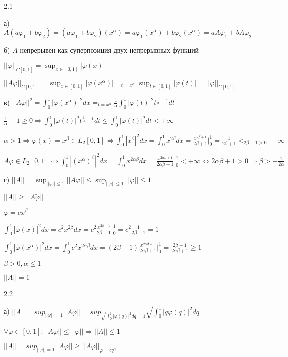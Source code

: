 \documentclass[russian]{article}
\begin{document}
2.1

а) $A(a\varphi_1+b\varphi_2)=(a\varphi_1+b\varphi_2)(x^\alpha)=a\varphi_1(x^\alpha)+b\varphi_2(x^\alpha)=aA\varphi_1+bA\varphi_2$

б) $A$ непрерывен как суперпозиция двух непрерывных функций

$||\varphi||_{C[0,1]}=\sup_{x\in[0,1]}|\varphi(x)|$

$||A\varphi||_{C[0,1]}=\sup_{x\in[0,1]}|\varphi(x^\alpha)|=_{t=x^\alpha}\sup_{t\in[0,1]}|\varphi(t)|=||\varphi||_{C[0,1]}$

в) $||A\varphi||^2=\int_0^1|\varphi(x^\alpha)|^2dx=_{t=x^\alpha}\frac{1}{\alpha}\int_0^1|\varphi(t)|^2t^{\frac{1}{\alpha}-1}dt$

$\frac{1}{\alpha}-1\ge0\Rightarrow\int_0^1|\varphi(t)|^2t^{\frac{1}{\alpha}-1}dt\le\int_0^1|\varphi(t)|^2dt<+\infty$

$\alpha>1\Rightarrow\varphi(x)=x^\beta\in L_2[0,1]\Leftrightarrow\int_0^1|x^\beta|^2dx=\int_0^1x^{2\beta}dx=\frac{x^{2\beta+1}}{2\beta+1}|_0^1=\frac{1}{2\beta+1}<_{2\beta+1>0}+\infty$

$A\varphi\in L_2[0,1] \Leftrightarrow \int_0^1|(x^\alpha)^\beta|^2dx=\int_0^1x^{2\alpha\beta}dx=\frac{x^{2\alpha\beta+1}}{2\alpha\beta+1}|_0^1<+\infty \Leftrightarrow 2\alpha\beta+1>0 \Rightarrow \beta > -\frac{1}{2\alpha}$

г) $||A||=\sup_{||\varphi|| \le 1}||A\varphi||\le\sup_{||\varphi|| \le 1}||\varphi|| \le 1$

$||A||\ge ||A\widetilde{\varphi}||$

$\widetilde{\varphi}=cx^\beta$

$\int_0^1|\widetilde{\varphi}(x)|^2dx=c^2x^{2\beta}dx=c^2\frac{x^{2\beta+1}}{2\beta+1}|_0^1=c^2\frac{1}{2\beta+1}=1$

$\int_0^1|\widetilde{\varphi}(x^\alpha)|^2dx=\int_0^1c^2x^{2\alpha\beta}dx=(2\beta+1)\frac{x^{2\alpha\beta+1}}{2\alpha\beta+1}|_0^1=\frac{2\beta+1}{2\alpha\beta+1}\ge 1$

$\beta > 0, \alpha\le1$

$||A||=1$


\pagebreak

2.2

а) $||A||=sup_{||\varphi||=1}||A\varphi||=sup_{\sqrt{\int_{0}^{1}|\varphi(q)|^{2}dq}=1}\sqrt{\int_{0}^{1}|q\varphi(q)|^{2}dq}$

$\forall\varphi\in[0,1]:||A\varphi||\le||\varphi||\Rightarrow||A||\le1$

$||A||=sup_{||\varphi||=1}||A\varphi||\ge||A\widetilde{\varphi}||_{\widetilde{\varphi}=cq^{\alpha}}$
\end{document}
